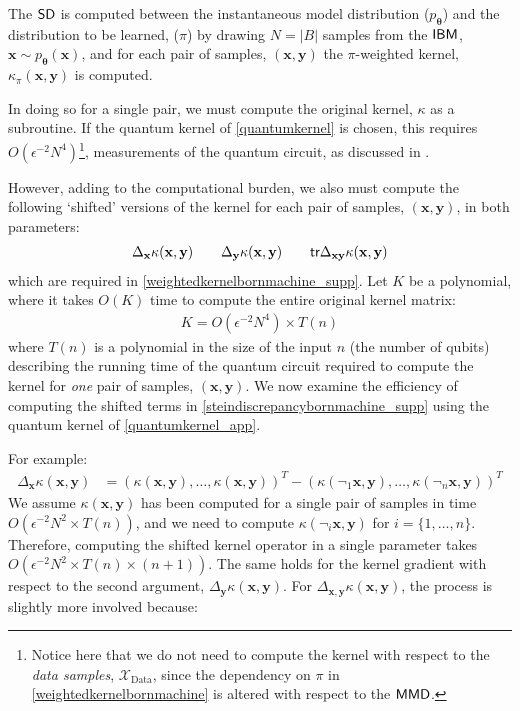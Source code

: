 The $\operatorname{\textsf{SD}}$ is computed between the instantaneous model distribution ($p_{\boldsymbol\theta}$) and the distribution to be learned, ($\pi$) by drawing $N = |B|$ samples from the $\textsf{IBM}$, $\mathbf{x}\sim p_{\boldsymbol\theta}(\mathbf{x})$, and for each pair of samples, $(\mathbf{x}, \mathbf{y})$ the $\pi$-weighted kernel, $\kappa_\pi(\mathbf{x}, \mathbf{y})$ is computed.

In doing so for a single pair, we must compute the original kernel, $\kappa$ as a subroutine. If the quantum kernel of \eqref{quantumkernel} is chosen, this requires $O\left(\epsilon^{-2}N^4\right)$\footnote{Notice here that we do not need to compute the kernel with respect to the \textit{data samples}, $\mathcal{X}_{\text{Data}}$, since the dependency on $\pi$ in \eqref{weightedkernelbornmachine} is altered with respect to the $\operatorname{\textsf{MMD}}$.}, measurements of the quantum circuit, as discussed in  .

However, adding to the computational burden, we also must compute the following `shifted' versions of the kernel for each pair of samples, $(\mathbf{x}, \mathbf{y})$, in both parameters:
\begin{align}
    \Delta_\mathbf{x}\kappa(\mathbf{x}, \mathbf{y}) \qquad \Delta_\mathbf{y}\kappa(\mathbf{x}, \mathbf{y}) \qquad  \textsf{tr}\Delta_{\mathbf{x}\mathbf{y}}\kappa(\mathbf{x}, \mathbf{y})
\end{align}
which are required in \eqref{weightedkernelbornmachine_supp}. Let $K$ be a polynomial, where it takes $O(K)$ time to compute the entire original kernel matrix:
\begin{align}
    K = O(\epsilon^{-2}N^4) \times T(n)
\end{align}
where $T(n)$ is a polynomial in the size of the input $n$ (the number of qubits) describing the running time of the quantum circuit required to compute the kernel for \textit{one} pair of samples, $(\mathbf{x}, \mathbf{y})$. We now examine the efficiency of computing the shifted terms in \eqref{steindiscrepancybornmachine_supp} using the quantum kernel of \eqref{quantumkernel_app}.

For example:
\begin{align}
    \Delta_{\mathbf{x}}\kappa(\mathbf{x}, \mathbf{y}) &= (\kappa(\mathbf{x}, \mathbf{y}), \dots, \kappa(\mathbf{x}, \mathbf{y}))^T- (\kappa(\neg_1\mathbf{x}, \mathbf{y}), \dots, \kappa(\neg_n\mathbf{x}, \mathbf{y}))^T \label{xshiftedterm}
\end{align}
We assume $\kappa(\mathbf{x}, \mathbf{y})$ has been computed for a single pair of samples in time $O(\epsilon^{-2}N^2 \times T(n))$, and we need to compute $\kappa(\neg_i\mathbf{x}, \mathbf{y})$ for $i = \{1,\dots, n\}$. Therefore, computing the shifted kernel operator in a single parameter takes $O(\epsilon^{-2}N^2 \times T(n)\times (n+1))$. The same holds for the kernel gradient with respect to the second argument, $\Delta_\mathbf{y}\kappa(\mathbf{x}, \mathbf{y})$.
For $\Delta_{\mathbf{x}, \mathbf{y}}\kappa(\mathbf{x}, \mathbf{y})$, the process is slightly more involved because:


